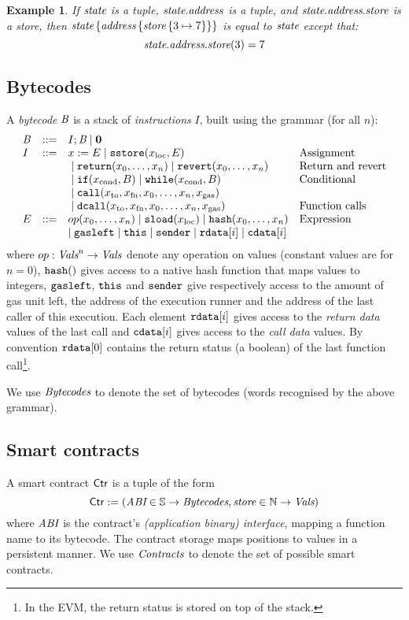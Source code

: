 \documentclass[12pt]{extarticle}
\newtheorem{example}{Example}
\begin{document}
\begin{example} If $\textit{state}$ is a tuple, $\textit{state}.\textit{address}$ is a tuple, and $\textit{state}.\textit{address}.\textit{store}$ is a store, then $\textit{state}\left\{\textit{address}\left\{\textit{store}\left\{3 \mapsto 7\right\}\right\}\right\}$ is equal to $\textit{state}$ except that:
$$\textit{state}.\textit{address}.\textit{store}(3) = 7$$
\end{example}

\subsection{Bytecodes}
A \emph{bytecode} $\textit{B}$ is a stack of \emph{instructions} $I$, built using the grammar (for all $n$):
$$\begin{array}{lcll}
\textit{B} &:: =& I ; \textit{B} \mid \mathbf{0} \\
I & :: =& x:=E \mid \mathtt{sstore}(x_\textrm{loc},E) & \hbox{Assignment} \\
&&{}\mid \mathtt{return}(x_0,\dots,x_n) \mid \mathtt{revert}(x_0,\dots,x_n) & \hbox{Return and revert} \\
&& {}\mid \mathtt{if}(x_\textrm{cond}, B) \mid \mathtt{while}(x_\textrm{cond},B)  & \hbox{Conditional}\\
&&{}\mid \mathtt{call}(x_\textrm{to}, x_\textrm{fn}, x_0, \dots, x_n,x_\textrm{gas})\\
&&{}\mid \mathtt{dcall}(x_\textrm{to}, x_\textrm{fn}, x_0, \dots, x_n,x_\textrm{gas})
 & \hbox{Function calls} \\
E & ::= & op(x_0,\dots,x_n)\mid \mathtt{sload}(x_\textrm{loc})\mid\mathtt{hash}(x_0,\dots,x_n) & \hbox{Expression} \\ 
&& \mid \texttt{gasleft} \mid \texttt{this} \mid \mathtt{sender}\mid \mathtt{rdata}[i] \mid\mathtt{cdata}[i] 
\end{array}
$$
where $op:\textit{Vals}^n\to \textit{Vals}$ denote any operation on values (constant values are for $n=0$), $\mathtt{hash}()$ gives access to a native hash function that maps values to integers, 
$\texttt{gasleft}$, $\texttt{this}$ and $\texttt{sender}$ give respectively access to the amount of gas unit left, the address of the execution runner and the address of the last caller of this execution. 
Each element $\mathtt{rdata}[i]$ gives access to the \emph{return data} values of the last call and 
$\mathtt{cdata}[i]$ gives access to the \emph{call data} values. By convention $\mathtt{rdata}[0]$ contains the return status (a boolean) of the last function call\footnote{In the EVM, the return status is stored on top of the stack.}.

We use $\textit{Bytecodes}$ to denote the set of bytecodes (words recognised by the above grammar).

\subsection{Smart contracts}
A smart contract $\mathsf{Ctr}$ is a tuple of the form $$\mathsf{Ctr}:=(\textit{ABI}\in \mathbb{S}\to \textit{Bytecodes}, \textit{store}\in \mathbb{N}\to \textit{Vals})$$ where $\textit{ABI}$ is the contract's \emph{(application binary) interface}, mapping a function name to its bytecode. The contract storage maps positions to values in a persistent manner. We use $\textit{Contracts}$ to denote the set of possible smart contracts.
\end{document}
